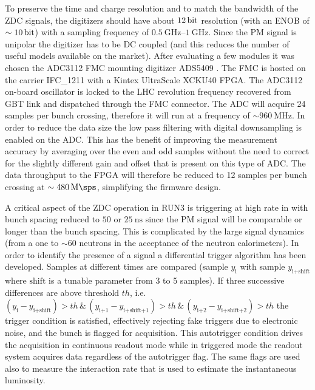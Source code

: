 To preserve the time and charge resolution 
and to match the bandwidth of the ZDC signals, the digitizers should have about $\SI{12}{\bit}$ resolution (with an ENOB of $\sim\SI{10}{\bit}$) with a sampling frequency of
$\SIrange[range-units=single,range-phrase=\div]{0.5}{1}{\giga\hertz}$. Since the PM signal is unipolar the digitizer has to be DC coupled (and this reduces the number of useful models available on the market). After evaluating a few modules it was chosen the ADC3112 FMC \cite{IOXOSADC3112} mounting digitizer ADS5409 \cite{TIADS5409}. The FMC is hosted on the carrier IFC\_1211 \cite{IOXOSIFC1211} with a Kintex UltraScale XCKU40 FPGA. The ADC3112 on-board oscillator is locked to the LHC revolution frequency recovered from GBT link and dispatched through the FMC connector. The ADC will acquire 24 samples per bunch crossing, therefore it will run at a frequency of
$\sim\SI{960}{\mega\hertz}$. In order to reduce the data size the low pass filtering with digital downsampling is enabled on the ADC. This has the benefit of improving the measurement accuracy by averaging over the even and odd samples without the need to correct for the slightly different gain and offset that is present on this type of ADC. The data throughput to the FPGA will therefore be reduced to 12 samples per bunch crossing at $\sim\SI{480}{\mega\sps}$, simplifying the firmware design.

A critical aspect of the ZDC operation in RUN3 is triggering at high rate in \PbPb with bunch spacing reduced to $\si{50}$ or $\SI{25}{\nano\second}$ since the PM signal will be comparable or longer than the bunch spacing. This is complicated by the large signal dynamics (from a one to $\sim60$ neutrons in the acceptance of the neutron calorimeters). In order to identify the presence of a signal a differential trigger algorithm has been developed. Samples at different times are compared (sample $y_{\textrm{i}}$ with sample $y_{\textrm{i+shift}}$ where $\textrm{shift}$ is a tunable parameter from 3 to 5 samples). If three successive differences are above threshold $th$, i.e. $\left(y_{\textrm{i}}-y_{\textrm{i+shift}}\right)>th\,\&\,\left(y_{\textrm{i+1}}-y_{\textrm{i+shift+1}}\right)>th\,\&\,\left(y_{\textrm{i+2}}-y_{\textrm{i+shift+2}}\right)>th$ 
the trigger condition is satisfied, effectively rejecting fake triggers due to electronic noise, and the bunch is flagged for acquisition. This autotrigger condition drives the acquisition in continuous readout mode while in triggered mode the readout system acquires data regardless of the autotrigger flag. The same flags are used also to measure the interaction rate that is used to estimate the instantaneous luminosity.

